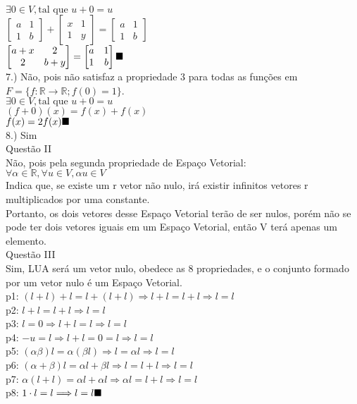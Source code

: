 \documentclass[12pt]{article}
\begin{document}
$\exists0\in V, \text{tal que }u+0=u$\\
$\begin{bmatrix}
	a & 1 \\
	1 & b
\end{bmatrix} + 
\begin{bmatrix}
	x & 1 \\
	1 & y
\end{bmatrix} = 
\begin{bmatrix}
	a & 1 \\
	1 & b
\end{bmatrix}$\\
$\begin{bmatrix}
	a+x & 2 \\
	2 & b+y
\end{bmatrix} = 
\begin{bmatrix}
	a & 1 \\
	1 & b
\end{bmatrix}\hfill\blacksquare$\\

7.) Não, pois não satisfaz a propriedade 3 para todas as funções em $F = \lbrace f: \mathds{R} \rightarrow \mathds{R}; f(0) = 1 \rbrace$.\\
$\exists0\in V, \text{tal que }u+0=u$\\
$(f+0)(x) = f(x) + f(x)$\\
$f(x) = 2f(x)\hfill\blacksquare$\\

8.) Sim\\

Questão II\\
Não, pois pela segunda propriedade de Espaço Vetorial:\\
$\forall \alpha \in \mathds{R}, \forall u \in V, \alpha u \in V$\\
Indica que, se existe um r vetor não nulo, irá existir infinitos vetores r multiplicados por uma constante.\\
Portanto, os dois vetores desse Espaço Vetorial terão de ser nulos, porém não se pode ter dois vetores iguais em um Espaço Vetorial, então V terá apenas um elemento.\\

Questão III\\
Sim, LUA será um vetor nulo, obedece as 8 propriedades, e o conjunto formado por um vetor nulo é um Espaço Vetorial.\\
p1: $(l+l)+l=l+(l+l)\Longrightarrow l+l=l+l\Longrightarrow l=l$\\
p2: $l+l=l+l\Longrightarrow l=l$\\
p3: $l=0\Longrightarrow l+l=l\Longrightarrow l=l$\\
p4: $-u=l\Longrightarrow l+l=0=l\Longrightarrow l=l$\\
p5: $(\alpha\beta)l = \alpha(\beta l) \Longrightarrow l = \alpha l \Longrightarrow l=l$\\
p6: $(\alpha+\beta)l = \alpha l +\beta l \Longrightarrow l = l+l \Longrightarrow l=l$\\
p7: $\alpha(l+l)=\alpha l+\alpha l\Longrightarrow\alpha l=l+l\Longrightarrow l=l$\\
p8: $1\cdot l = l \Longrightarrow l = l\hfill\blacksquare$\\
\end{document}
